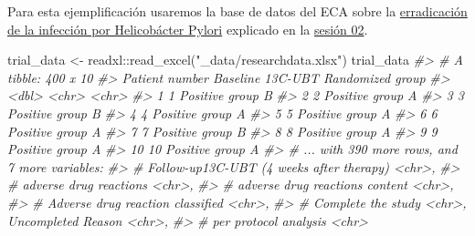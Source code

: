 \documentclass[
]{book}
\newenvironment{Shaded}{\begin{snugshade}}{\end{snugshade}}
\newcommand{\CommentTok}[1]{\textcolor[rgb]{0.56,0.35,0.01}{\textit{#1}}}
\newcommand{\FunctionTok}[1]{\textcolor[rgb]{0.00,0.00,0.00}{#1}}
\newcommand{\NormalTok}[1]{#1}
\newcommand{\OtherTok}[1]{\textcolor[rgb]{0.56,0.35,0.01}{#1}}
\newcommand{\SpecialCharTok}[1]{\textcolor[rgb]{0.00,0.00,0.00}{#1}}
\newcommand{\StringTok}[1]{\textcolor[rgb]{0.31,0.60,0.02}{#1}}
\begin{document}
Para esta ejemplificación usaremos la base de datos del ECA sobre la \href{https://www.nature.com/articles/s41598-018-27482-2}{erradicación de la infección por Helicobácter Pylori} explicado en la \href{https://healthinnovation.github.io/curso-introduccion-r-tidyverse/sesion_02/\#14}{sesión 02}.

\begin{Shaded}
\begin{Highlighting}[]
\NormalTok{trial\_data }\OtherTok{\textless{}{-}}\NormalTok{ readxl}\SpecialCharTok{::}\FunctionTok{read\_excel}\NormalTok{(}\StringTok{"\_data/researchdata.xlsx"}\NormalTok{)}
\NormalTok{trial\_data}
\CommentTok{\#\textgreater{} \# A tibble: 400 x 10}
\CommentTok{\#\textgreater{}    \textasciigrave{}Patient number\textasciigrave{} \textasciigrave{}Baseline 13C{-}UBT\textasciigrave{} \textasciigrave{}Randomized group\textasciigrave{}}
\CommentTok{\#\textgreater{}               \textless{}dbl\textgreater{} \textless{}chr\textgreater{}              \textless{}chr\textgreater{}             }
\CommentTok{\#\textgreater{}  1                1 Positive           group B           }
\CommentTok{\#\textgreater{}  2                2 Positive           group A           }
\CommentTok{\#\textgreater{}  3                3 Positive           group B           }
\CommentTok{\#\textgreater{}  4                4 Positive           group A           }
\CommentTok{\#\textgreater{}  5                5 Positive           group A           }
\CommentTok{\#\textgreater{}  6                6 Positive           group A           }
\CommentTok{\#\textgreater{}  7                7 Positive           group B           }
\CommentTok{\#\textgreater{}  8                8 Positive           group A           }
\CommentTok{\#\textgreater{}  9                9 Positive           group A           }
\CommentTok{\#\textgreater{} 10               10 Positive           group A           }
\CommentTok{\#\textgreater{} \# ... with 390 more rows, and 7 more variables:}
\CommentTok{\#\textgreater{} \#   \textasciigrave{}Follow{-}up13C{-}UBT (4 weeks after therapy)\textasciigrave{} \textless{}chr\textgreater{},}
\CommentTok{\#\textgreater{} \#   \textasciigrave{}adverse drug reactions\textasciigrave{} \textless{}chr\textgreater{},}
\CommentTok{\#\textgreater{} \#   \textasciigrave{}adverse drug reactions  content\textasciigrave{} \textless{}chr\textgreater{},}
\CommentTok{\#\textgreater{} \#   \textasciigrave{}Adverse drug reaction classified\textasciigrave{} \textless{}chr\textgreater{},}
\CommentTok{\#\textgreater{} \#   \textasciigrave{}Complete the study\textasciigrave{} \textless{}chr\textgreater{}, \textasciigrave{}Uncompleted Reason\textasciigrave{} \textless{}chr\textgreater{},}
\CommentTok{\#\textgreater{} \#   \textasciigrave{}per protocol analysis\textasciigrave{} \textless{}chr\textgreater{}}
\end{Highlighting}
\end{Shaded}
\end{document}
